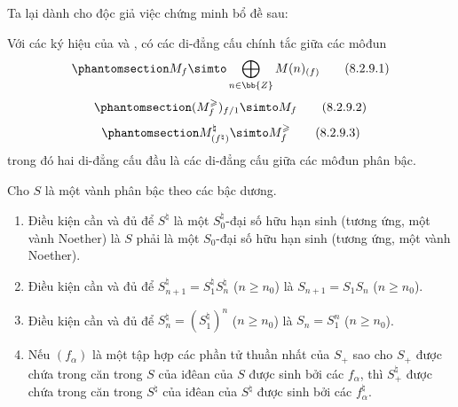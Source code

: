 \documentclass[oneside,10pt]{amsart}
\renewcommand{\geq}{\geqslant}
\let\EGAOriginalLabel\label
\renewcommand{\label}[1]{\phantomsection\EGAOriginalLabel{#1}}
\begin{document}
Ta lại dành cho độc giả việc chứng minh bổ đề sau:
\begin{lemma}[8.2.9]
\label{II.8.2.9}
Với các ký hiệu của  và , có các di-đẳng cấu chính tắc giữa các môđun
\[
\label{II.8.2.9.1}
  M_f \simto \bigoplus_{n\in\bb{Z}} M(n)_{(f)}
\tag{8.2.9.1}
\]
\[
\label{II.8.2.9.2}
  (M_f^\geq)_{f/1} \simto M_f
\tag{8.2.9.2}
\]
\[
\label{II.8.2.9.3}
  M_{(f^\natural)}^\natural \simto M_f^\geq
\tag{8.2.9.3}
\]
trong đó hai di-đẳng cấu đầu là các di-đẳng cấu giữa các môđun phân bậc.
\end{lemma}

\begin{lemma}[8.2.10]
\label{II.8.2.10}
Cho $S$ là một vành phân bậc theo các bậc dương.
\begin{enumerate}
  \item[\rm{(i)}] Điều kiện cần và đủ để $S^\natural$ là một $S_0^\natural$-đại số hữu hạn sinh (tương ứng, một vành Noether) là $S$ phải là một $S_0$-đại số hữu hạn sinh (tương ứng, một vành Noether).
  \item[\rm{(ii)}] Điều kiện cần và đủ để $S_{n+1}^\natural = S_1^\natural S_n^\natural$ ($n\geq n_0$) là $S_{n+1}=S_1S_n$ ($n\geq n_0$).
  \item[\rm{(iii)}] Điều kiện cần và đủ để $S_n^\natural = (S_1^\natural)^n$ ($n\geq n_0$) là $S_n=S_1^n$ ($n\geq n_0$).
  \item[\rm{(iv)}] Nếu $(f_\alpha)$ là một tập hợp các phần tử thuần nhất của $S_+$ sao cho $S_+$ được chứa trong căn trong $S$ của iđêan của $S$ được sinh bởi các $f_\alpha$, thì $S_+^\natural$ được chứa trong căn trong $S^\natural$ của iđêan của $S^\natural$ được sinh bởi các $f_\alpha^\natural$.
\end{enumerate}
\end{lemma}
\end{document}
